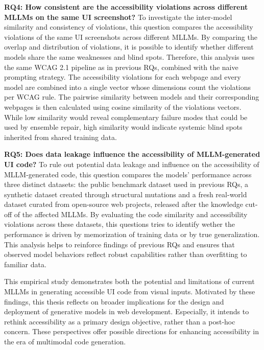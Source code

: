 \textbf{RQ4: How consistent are the accessibility violations across different MLLMs on the same UI screenshot?}
To investigate the inter-model similarity and consistency of violations, this question compares the 
accessibility violations of the same UI screenshots 
across different MLLMs. By comparing the overlap and 
distribution of violations, it is possible to identify 
whether different models share the same weaknesses and
blind spots. Therefore, this analysis uses the same WCAG 
2.1 pipeline as in previous RQs, combined with the naive prompting 
strategy. The accessibility violations for each webpage 
and every model are combined into a single vector whose 
dimensions count the violations per WCAG rule. The 
pairwise similarity between models and their corresponding
webpages is then calculated using cosine similarity of 
the violations vectors. While low similarity would reveal 
complementary failure modes that could be used by ensemble 
repair, high similarity would indicate systemic blind spots 
inherited from shared training data.\newline




\textbf{RQ5: Does data leakage influence the accessibility of MLLM-generated UI code?}
To rule out potential data leakage and influence on the accessibility 
of MLLM-generated code, this question compares the models' performance across
three distinct datasets: the public benchmark dataset used in previous 
RQs, a synthetic dataset created through structural mutations and 
a fresh real-world dataset curated from open-source web projects, 
released after the knowledge cut-off of the affected MLLMs. By 
evaluating the code similarity and accessibility violations across
these datasets, this questions tries to identify wether the 
performance is driven by memorization of training data or by 
true generalization. This analysis helps to reinforce findings 
of previous RQs and ensures that observed model behaviors reflect
robust capabilities rather than overfitting to familiar data.\newline

This empirical study demonstrates both the potential and 
limitations of current MLLMs in generating accessible UI code 
from visual inputs. 
Motivated by these findings, this thesis reflects on broader implications
for the design and deployment of generative models in web development. Especially, it 
intends to rethink accessibility as a primary design objective, rather than a 
post-hoc concern. These perspectives offer possible directions for enhancing accessibility in the era of multimodal code generation.



